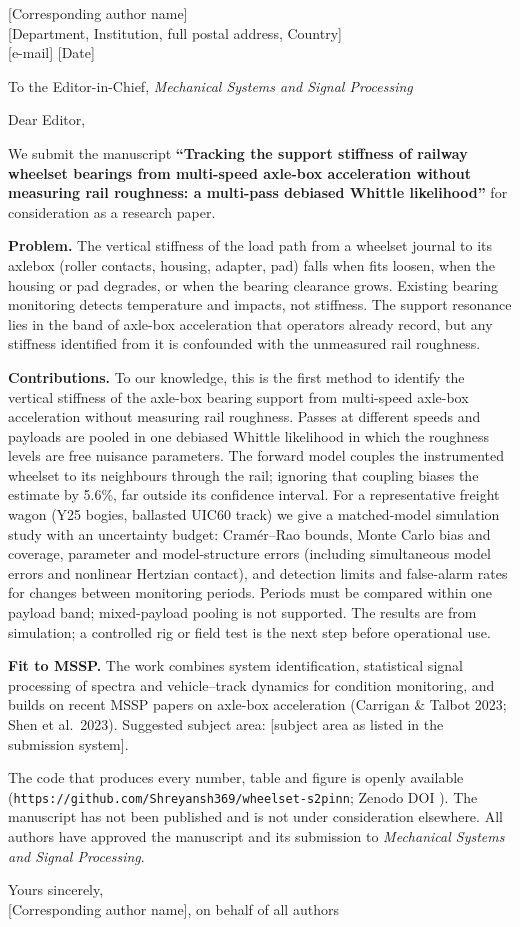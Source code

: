 \documentclass[11pt,a4paper]{article}
\begin{document}
\noindent{}[Corresponding author name]\\{}
{}[Department, Institution, full postal address, Country]\\{}
[e-mail] \hfill [Date]

\medskip
\noindent To the Editor-in-Chief, \emph{Mechanical Systems and Signal Processing}

Dear Editor,

We submit the manuscript \textbf{``Tracking the support stiffness of railway wheelset bearings from
multi-speed axle-box acceleration without measuring rail roughness: a multi-pass debiased Whittle
likelihood''} for consideration as a research paper.

\textbf{Problem.} The vertical stiffness of the load path from a wheelset journal to its axlebox (roller
contacts, housing, adapter, pad) falls when fits loosen, when the housing or pad degrades, or when the
bearing clearance grows. Existing bearing monitoring detects temperature and impacts, not stiffness.
The support resonance lies in the band of axle-box acceleration that operators already record, but any
stiffness identified from it is confounded with the unmeasured rail roughness.

\textbf{Contributions.} To our knowledge, this is the first method to identify the vertical stiffness of
the axle-box bearing support from multi-speed axle-box acceleration without measuring rail roughness.
Passes at different speeds and payloads are pooled in one debiased Whittle likelihood in which the
roughness levels are free nuisance parameters. The forward model couples the instrumented wheelset to
its neighbours through the rail; ignoring that coupling biases the estimate by 5.6\%, far outside its
confidence interval.
For a representative freight wagon (Y25 bogies, ballasted UIC60 track) we give a matched-model
simulation study with an uncertainty budget: Cram\'er--Rao bounds, Monte Carlo bias and coverage,
parameter and model-structure errors (including simultaneous model errors and nonlinear Hertzian
contact), and detection limits and false-alarm rates for changes between monitoring periods. Periods must
be compared within one payload band; mixed-payload pooling is not supported. The results are from
simulation; a controlled rig or field test is the next step before operational use.

\textbf{Fit to MSSP.} The work combines system identification, statistical signal processing of
spectra and vehicle--track dynamics for condition monitoring, and builds on recent MSSP papers on
axle-box acceleration (Carrigan \& Talbot 2023; Shen et al.\ 2023). Suggested subject area:
[subject area as listed in the submission system].

The code that produces every number, table and figure is openly available
(\texttt{https://github.com/Shreyansh369/wheelset-s2pinn}; Zenodo DOI \ZenodoDOI). The manuscript has
not been published and is not under consideration elsewhere. All authors have approved the manuscript
and its submission to \emph{Mechanical Systems and Signal Processing}.

Yours sincerely,\\[2mm]
[Corresponding author name], on behalf of all authors
\end{document}
